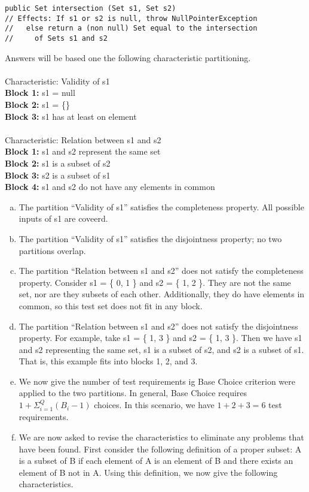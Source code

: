 \documentclass{article}
\begin{document}
\begin{verbatim}
public Set intersection (Set s1, Set s2)
// Effects: If s1 or s2 is null, throw NullPointerException
//   else return a (non null) Set equal to the intersection
//     of Sets s1 and s2
\end{verbatim}
Answers will be based one the following characteristic partitioning. \\\\
Characteristic: Validity of s1 \\
\indent \textbf{Block 1:} s1 = null \\
\indent \textbf{Block 2:} s1 = \{\} \\
\indent \textbf{Block 3:} s1 has at least on element \\\\
Characteristic: Relation between s1 and s2 \\
\indent \textbf{Block 1:} s1 and s2 represent the same set \\
\indent \textbf{Block 2:} s1 is a subset of s2 \\
\indent \textbf{Block 3:} s2 is a subset of s1 \\
\indent \textbf{Block 4:} s1 and s2 do not have any elements in common \\
\begin{enumerate}[(a)]
	\item The partition ``Validity of s1'' satisfies the completeness property. All possible inputs of s1 are coveerd.
	\item The partition ``Validity of s1'' satisfies the disjointness property; no two partitions overlap.
	\item The partition ``Relation between s1 and s2'' does not satisfy the completeness property. Consider s1 = \{ 0, 1 \} and s2 = \{ 1, 2 \}. They are not the same set, nor are they subsets of each other. Additionally, they do have elements in common, so this test set does not fit in any block.
	\item The partition ``Relation between s1 and s2'' does not satisfy the disjointness property. For example, take s1 = \{ 1, 3 \} and s2 = \{ 1, 3 \}. Then we have s1 and s2 representing the same set, s1 is a subset of s2, and s2 is a subset of s1. That is, this example fits into blocks 1, 2, and 3.
	\item We now give the number of test requirements ig Base Choice criterion were applied to the two partitions. In general, Base Choice requires $1 + \Sigma _{i=1} ^Q (B_i - 1)$ choices. In this scenario, we have $1 + 2 + 3 = 6$ test requirements.
	\item We are now asked to revise the characteristics to eliminate any problems that have been found. First consider the following definition of a proper subset: A is a subset of B if each element of A is an element of B and there exists an element of B not in A. Using this definition, we now give the following characteristics.
\end{enumerate}
\end{document}
